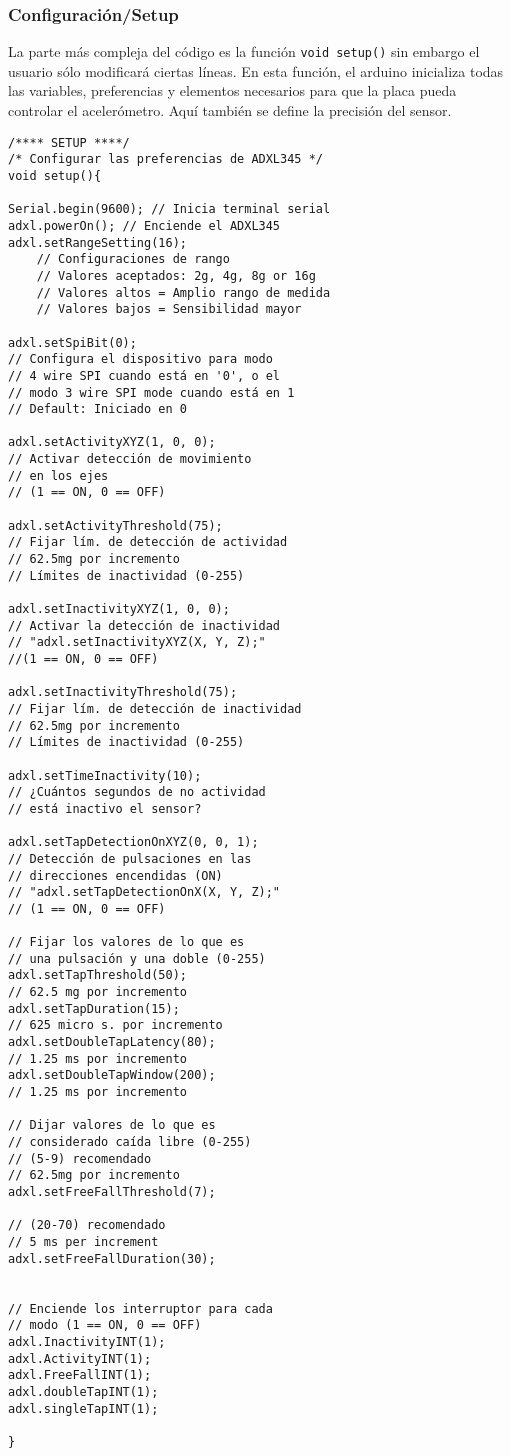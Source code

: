 \documentclass[10pt, a4paper, twocolumn]{article} %
\begin{document}
\subsubsection{Configuración/Setup}

La parte más compleja del código es la función \texttt{void setup()} sin embargo el usuario sólo modificará ciertas líneas. En esta función, el arduino inicializa todas las variables, preferencias y elementos necesarios para que la placa pueda controlar el acelerómetro. Aquí también se define la precisión del sensor.


\begin{verbatim}
/**** SETUP ****/
/* Configurar las preferencias de ADXL345 */
void setup(){

Serial.begin(9600); // Inicia terminal serial
adxl.powerOn(); // Enciende el ADXL345
adxl.setRangeSetting(16);           
    // Configuraciones de rango
    // Valores aceptados: 2g, 4g, 8g or 16g
    // Valores altos = Amplio rango de medida
    // Valores bajos = Sensibilidad mayor

adxl.setSpiBit(0);                  
// Configura el dispositivo para modo 
// 4 wire SPI cuando está en '0', o el
// modo 3 wire SPI mode cuando está en 1                                    
// Default: Iniciado en 0

adxl.setActivityXYZ(1, 0, 0);
// Activar detección de movimiento
// en los ejes
// (1 == ON, 0 == OFF)

adxl.setActivityThreshold(75);      
// Fijar lím. de detección de actividad
// 62.5mg por incremento   
// Límites de inactividad (0-255)

adxl.setInactivityXYZ(1, 0, 0);     
// Activar la detección de inactividad 
// "adxl.setInactivityXYZ(X, Y, Z);" 
//(1 == ON, 0 == OFF)

adxl.setInactivityThreshold(75);
// Fijar lím. de detección de inactividad    
// 62.5mg por incremento  
// Límites de inactividad (0-255)

adxl.setTimeInactivity(10);
// ¿Cuántos segundos de no actividad
// está inactivo el sensor?

adxl.setTapDetectionOnXYZ(0, 0, 1); 
// Detección de pulsaciones en las 
// direcciones encendidas (ON)
// "adxl.setTapDetectionOnX(X, Y, Z);" 
// (1 == ON, 0 == OFF)

// Fijar los valores de lo que es
// una pulsación y una doble (0-255)
adxl.setTapThreshold(50);
// 62.5 mg por incremento
adxl.setTapDuration(15);
// 625 micro s. por incremento
adxl.setDoubleTapLatency(80);
// 1.25 ms por incremento
adxl.setDoubleTapWindow(200);
// 1.25 ms por incremento

// Dijar valores de lo que es
// considerado caída libre (0-255)
// (5-9) recomendado
// 62.5mg por incremento
adxl.setFreeFallThreshold(7);

// (20-70) recomendado
// 5 ms per increment
adxl.setFreeFallDuration(30);


// Enciende los interruptor para cada
// modo (1 == ON, 0 == OFF)
adxl.InactivityINT(1);
adxl.ActivityINT(1);
adxl.FreeFallINT(1);
adxl.doubleTapINT(1);
adxl.singleTapINT(1);

}

\end{verbatim}
\end{document}
